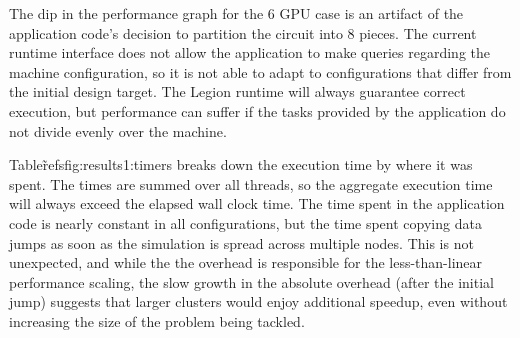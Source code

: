 The dip in the performance graph for the 6 GPU case is an artifact of the
application code's decision to partition the circuit into 8 pieces.  The
current runtime interface does not allow the application to make queries
regarding the machine configuration, so it is not able to adapt to
configurations that differ from the initial design target.  The Legion runtime
will always guarantee correct execution, but performance can suffer if the
tasks provided by the application do not divide evenly over the machine.

Table\~ref{sfig:results1:timers} breaks down the execution time by where it was
spent.  The times are summed over all threads, so the aggregate execution time
will always exceed the elapsed wall clock time.  The time spent in the 
application code is nearly constant in all configurations, but the time spent
copying data jumps as soon as the simulation is spread across multiple nodes.
This is not unexpected, and while the the overhead is responsible for the
less-than-linear performance scaling, the slow growth in the absolute overhead
(after the initial jump) suggests that larger clusters would enjoy additional
speedup, even without increasing the size of the problem being tackled.



